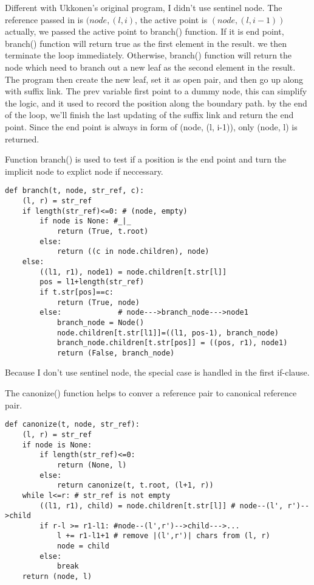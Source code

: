 \documentclass{article}
\begin{document}
Different with Ukkonen's original program, I didn't use sentinel node.
The reference passed in is $(node, (l, i)$, the active point is
$(node, (l, i-1))$ actually, we passed the active point to branch() 
function. If it is end point, branch() function will return true
as the first element in the result. we then terminate the loop immediately.
Otherwise, branch() function will return the node which need to branch
out a new leaf as the second element in the result. The program
then create the new leaf, set it as open pair, and then go up along
with suffix link. The prev variable first point to a dummy node,
this can simplify the logic, and it used to record the position along
the boundary path. by the end of the loop, we'll finish the last
updating of the suffix link and return the end point. Since the end
point is always in form of (node, (l, i-1)), only (node, l) is returned.

Function branch() is used to test if a position is the end point
and turn the implicit node to explict node if neccessary.

\begin{lstlisting}
def branch(t, node, str_ref, c):
    (l, r) = str_ref
    if length(str_ref)<=0: # (node, empty)
        if node is None: #_|_
            return (True, t.root)
        else:
            return ((c in node.children), node)
    else:
        ((l1, r1), node1) = node.children[t.str[l]]
        pos = l1+length(str_ref)
        if t.str[pos]==c:
            return (True, node)
        else:             # node--->branch_node--->node1
            branch_node = Node()
            node.children[t.str[l1]]=((l1, pos-1), branch_node)
            branch_node.children[t.str[pos]] = ((pos, r1), node1)
            return (False, branch_node)
\end{lstlisting}

Because I don't use sentinel node, the special case is handled
in the first if-clause.

The canonize() function helps to conver a reference pair to 
canonical reference pair.

\begin{lstlisting}
def canonize(t, node, str_ref):
    (l, r) = str_ref 
    if node is None:
        if length(str_ref)<=0:
            return (None, l)
        else:
            return canonize(t, t.root, (l+1, r))
    while l<=r: # str_ref is not empty
        ((l1, r1), child) = node.children[t.str[l]] # node--(l', r')-->child
        if r-l >= r1-l1: #node--(l',r')-->child--->...
            l += r1-l1+1 # remove |(l',r')| chars from (l, r)
            node = child 
        else:
            break
    return (node, l)
\end{lstlisting}
\end{document}
